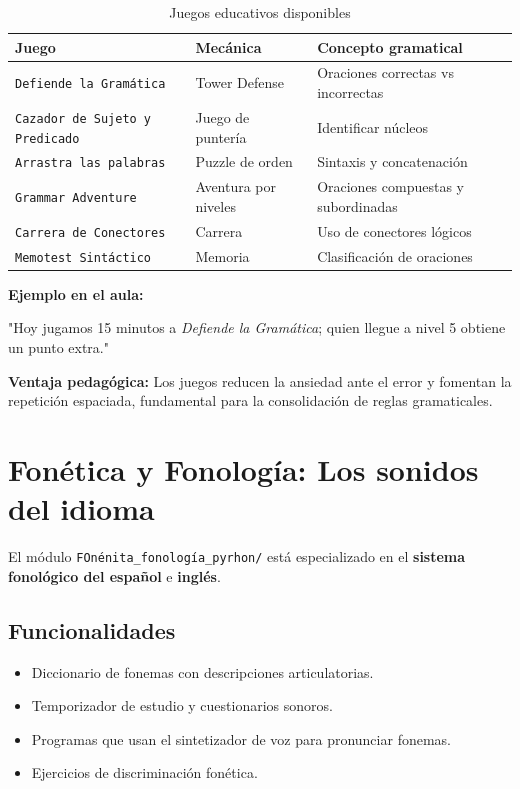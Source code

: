 \documentclass[12pt,spanish]{article}
\begin{document}
\begin{table}[H]
\centering
\caption{Juegos educativos disponibles}
\label{tab:juegos}
\begin{tabular}{|p{5cm}|p{4cm}|p{5cm}|}
\hline
\textbf{Juego} & \textbf{Mecánica} & \textbf{Concepto gramatical} \\
\hline
\texttt{Defiende la Gramática} & Tower Defense & Oraciones correctas vs incorrectas \\
\hline
\texttt{Cazador de Sujeto y Predicado} & Juego de puntería & Identificar núcleos \\
\hline
\texttt{Arrastra las palabras} & Puzzle de orden & Sintaxis y concatenación \\
\hline
\texttt{Grammar Adventure} & Aventura por niveles & Oraciones compuestas y subordinadas \\
\hline
\texttt{Carrera de Conectores} & Carrera & Uso de conectores lógicos \\
\hline
\texttt{Memotest Sintáctico} & Memoria & Clasificación de oraciones \\
\hline
\end{tabular}
\end{table}

\begin{ejemplo}
\textbf{Ejemplo en el aula:}

"Hoy jugamos 15 minutos a \textit{Defiende la Gramática}; quien llegue a nivel 5 obtiene un punto extra."
\end{ejemplo}

\begin{nota}
\textbf{Ventaja pedagógica:} Los juegos reducen la ansiedad ante el error y fomentan la repetición espaciada, fundamental para la consolidación de reglas gramaticales.
\end{nota}

\section{Fonética y Fonología: Los sonidos del idioma}

El módulo \texttt{FOnénita\_fonología\_pyrhon/} está especializado en el \textbf{sistema fonológico del español} e \textbf{inglés}.

\subsection{Funcionalidades}

\begin{itemize}
    \item Diccionario de fonemas con descripciones articulatorias.
    \item Temporizador de estudio y cuestionarios sonoros.
    \item Programas que usan el sintetizador de voz para pronunciar fonemas.
    \item Ejercicios de discriminación fonética.
\end{itemize}
\end{document}
